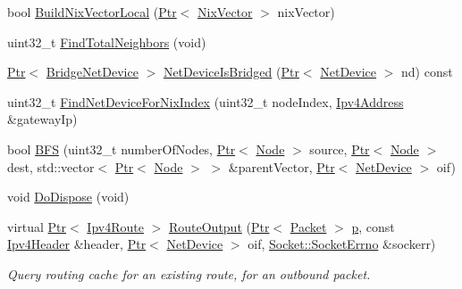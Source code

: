 \begin{DoxyCompactItemize}
\item 
bool \hyperlink{classns3_1_1Ipv4NixVectorRouting_a86ca754bc22b1714ffe7a4b858cda72d}{Build\+Nix\+Vector\+Local} (\hyperlink{classns3_1_1Ptr}{Ptr}$<$ \hyperlink{classns3_1_1NixVector}{Nix\+Vector} $>$ nix\+Vector)
\item 
uint32\+\_\+t \hyperlink{classns3_1_1Ipv4NixVectorRouting_ae4d125bd51c2d70084543489f00060b5}{Find\+Total\+Neighbors} (void)
\item 
\hyperlink{classns3_1_1Ptr}{Ptr}$<$ \hyperlink{classns3_1_1BridgeNetDevice}{Bridge\+Net\+Device} $>$ \hyperlink{classns3_1_1Ipv4NixVectorRouting_abf47d63e2dbb8022a042743feeb569c6}{Net\+Device\+Is\+Bridged} (\hyperlink{classns3_1_1Ptr}{Ptr}$<$ \hyperlink{classns3_1_1NetDevice}{Net\+Device} $>$ nd) const 
\item 
uint32\+\_\+t \hyperlink{classns3_1_1Ipv4NixVectorRouting_abbd212141a650d5260455663d59c24c9}{Find\+Net\+Device\+For\+Nix\+Index} (uint32\+\_\+t node\+Index, \hyperlink{classns3_1_1Ipv4Address}{Ipv4\+Address} \&gateway\+Ip)
\item 
bool \hyperlink{classns3_1_1Ipv4NixVectorRouting_aba4436060833304f21000470702da6d9}{B\+FS} (uint32\+\_\+t number\+Of\+Nodes, \hyperlink{classns3_1_1Ptr}{Ptr}$<$ \hyperlink{classns3_1_1Node}{Node} $>$ source, \hyperlink{classns3_1_1Ptr}{Ptr}$<$ \hyperlink{classns3_1_1Node}{Node} $>$ dest, std\+::vector$<$ \hyperlink{classns3_1_1Ptr}{Ptr}$<$ \hyperlink{classns3_1_1Node}{Node} $>$ $>$ \&parent\+Vector, \hyperlink{classns3_1_1Ptr}{Ptr}$<$ \hyperlink{classns3_1_1NetDevice}{Net\+Device} $>$ oif)
\item 
void \hyperlink{classns3_1_1Ipv4NixVectorRouting_a56f3712cab7976e071d487eb686c9280}{Do\+Dispose} (void)
\item 
virtual \hyperlink{classns3_1_1Ptr}{Ptr}$<$ \hyperlink{classns3_1_1Ipv4Route}{Ipv4\+Route} $>$ \hyperlink{classns3_1_1Ipv4NixVectorRouting_ac7bbf06105fc46edc431bdc7be58f3e7}{Route\+Output} (\hyperlink{classns3_1_1Ptr}{Ptr}$<$ \hyperlink{classns3_1_1Packet}{Packet} $>$ \hyperlink{lte__link__budget__x2__handover__measures_8m_ac9de518908a968428863f829398a4e62}{p}, const \hyperlink{classns3_1_1Ipv4Header}{Ipv4\+Header} \&header, \hyperlink{classns3_1_1Ptr}{Ptr}$<$ \hyperlink{classns3_1_1NetDevice}{Net\+Device} $>$ oif, \hyperlink{classns3_1_1Socket_ada1328c5ae0c28cb2a982caf8f6d6cca}{Socket\+::\+Socket\+Errno} \&sockerr)
\begin{DoxyCompactList}\small\item\em Query routing cache for an existing route, for an outbound packet. \end{DoxyCompactList}\item 

\end{DoxyCompactItemize}
